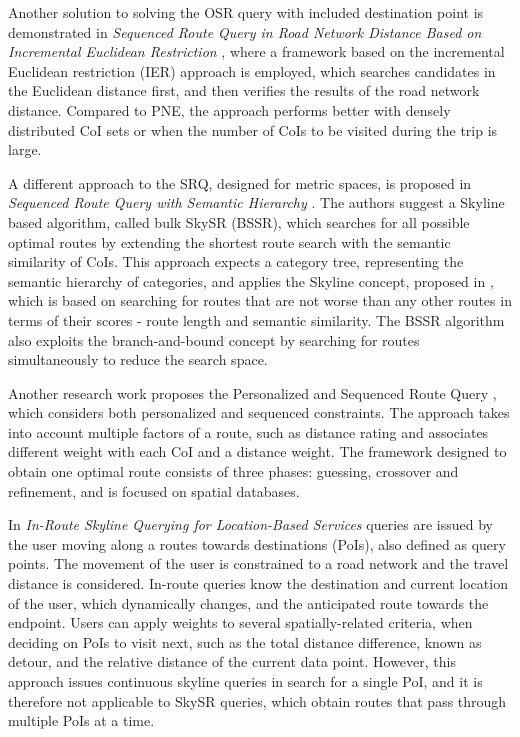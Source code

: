 Another solution to solving the OSR query with included destination point is demonstrated in \textit{Sequenced Route Query in Road Network Distance Based on Incremental Euclidean Restriction} \cite{betterOSR}, where a framework based on the incremental Euclidean restriction (IER) approach is employed, which searches candidates in the Euclidean distance first, and then verifies the results of the road network distance. Compared to PNE, the approach performs better with densely distributed CoI sets or when the number of CoIs to be visited during the trip is large.

A different approach to the SRQ, designed for metric spaces, is proposed in \textit{Sequenced Route Query with Semantic Hierarchy} \cite{semanticSRQ}. The authors suggest a Skyline based algorithm, called bulk SkySR (BSSR), which searches for all possible optimal routes by extending the shortest route search with the semantic similarity of CoIs. This approach expects a category tree, representing the semantic hierarchy of categories, and applies the Skyline concept, proposed in \cite{skyOp}, which is based on searching for routes that are not worse than any other routes in terms of their scores - route length and semantic similarity. The BSSR algorithm also exploits the branch-and-bound concept by searching for routes simultaneously to reduce the search space. 

Another research work proposes the Personalized and Sequenced Route Query \cite{personalSRQ}, which considers both personalized and sequenced constraints. The approach takes into account multiple factors of a route, such as distance rating and associates different weight with each CoI and a distance weight. The framework designed to obtain one optimal route consists of three phases: guessing, crossover and refinement, and is focused on spatial databases. 

In \textit{In-Route Skyline Querying for Location-Based Services} \cite{dynamicSRQ} queries are issued by the user moving along a routes towards destinations (PoIs), also defined as query points. The movement of the user is constrained to a road network and the travel distance is considered. In-route queries know the destination and current location of the user, which dynamically changes, and the anticipated route towards the endpoint. Users can apply weights to several spatially-related criteria, when deciding on PoIs to visit next, such as the total distance difference, known as detour, and the relative distance of the current data point. However, this approach issues continuous skyline queries in search for a single PoI, and it is therefore not applicable to SkySR queries, which obtain routes that pass through multiple PoIs at a time. 

